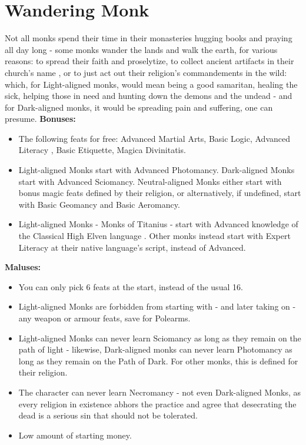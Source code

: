 \section{Wandering Monk}
Not all monks spend their time in their monasteries hugging books and praying all day long - some monks wander the lands and walk the earth, for various reasons: to spread their faith and proselytize, to collect ancient artifacts in their church's name , or to just act out their religion's commandements in the wild: which, for Light-aligned monks, would mean being a good samaritan, healing the sick, helping those in need and hunting down the demons and the undead - and for Dark-aligned monks, it would be spreading pain and suffering, one can presume. \newline
\textbf{Bonuses:}
\begin{itemize}
	\item The following feats for free: Advanced Martial Arts, Basic Logic, Advanced Literacy , Basic Etiquette, Magica Divinitatis.
	\item Light-aligned Monks start with Advanced Photomancy. Dark-aligned Monks start with Advanced Sciomancy. Neutral-aligned Monks either start with bonus magic feats defined by their religion, or alternatively, if undefined, start with Basic Geomancy and Basic Aeromancy.
	\item Light-aligned Monks - Monks of Titanius - start with Advanced knowledge of the Classical High Elven language . Other monks instead start with Expert Literacy at their native language's script, instead of Advanced.
\end{itemize}
\textbf{Maluses:}
\begin{itemize}
	\item You can only pick 6 feats at the start, instead of the usual 16.
	\item Light-aligned Monks are forbidden from starting with - and later taking on - any weapon or armour feats, save for Polearms.
	\item Light-aligned Monks can never learn Sciomancy as long as they remain on the path of light - likewise, Dark-aligned monks can never learn Photomancy as long as they remain on the Path of Dark. For other monks, this is defined for their religion.
	\item The character can never learn Necromancy - not even Dark-aligned Monks, as every religion in existence  abhors the practice and agree that desecrating the dead is a serious sin that should not be tolerated.
	\item Low amount of starting money.
\end{itemize}
